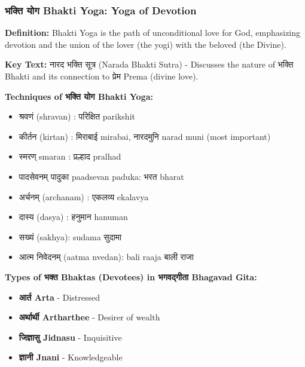 \begin{frame}[fragile]\frametitle{भक्ति  योग Bhakti Yoga: Yoga of Devotion}
    \textbf{Definition:} Bhakti Yoga is the path of unconditional love for God, emphasizing devotion and the union of the lover (the yogi) with the beloved (the Divine).

    
    \textbf{Key Text:} नारद भक्ति सूत्र (Narada Bhakti Sutra) - Discusses the nature of भक्ति Bhakti and its connection to प्रेम Prema (divine love).

    
    \textbf{Techniques of भक्ति  योग Bhakti Yoga:}
    \begin{itemize}
        \item श्रवणं (shravan) : परिक्षित  parikshit
        \item कीर्तन (kirtan) : मिराबाई  mirabai, नारदमुनि narad muni (most important)
        \item स्मरण् smaran : प्रल्हाद  pralhad   
        \item पादसेवनम् पादुका paadsevan paduka: भरत bharat
        \item अर्चनम् (archanam) : एकलव्य ekalavya
        \item दास्य (dasya) : हनुमान hanuman
        \item सख्यं  (sakhya): sudama सुदामा
        \item आत्म निवेदनम् (aatma nvedan): bali raaja बाली राजा
    \end{itemize}

    
    \textbf{Types of भक्त  Bhaktas (Devotees) in भगवद्गीता  Bhagavad Gita:}
    \begin{itemize}
        \item \textbf{आर्त  Arta} - Distressed
        \item \textbf{अर्थार्थी Artharthee} - Desirer of wealth
        \item \textbf{जिज्ञासु Jidnasu} - Inquisitive
        \item \textbf{ज्ञानी Jnani} - Knowledgeable
		
    \end{itemize}
\end{frame}

